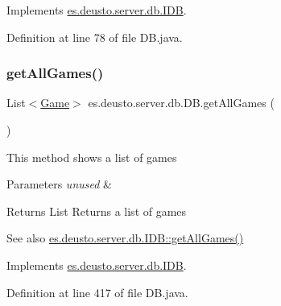 Implements \hyperlink{interfacees_1_1deusto_1_1server_1_1db_1_1_i_d_b_af7500b1f7c74d658837ed1a5ec82ebec}{es.\+deusto.\+server.\+db.\+I\+DB}.



Definition at line 78 of file D\+B.\+java.

\mbox{\label{classes_1_1deusto_1_1server_1_1db_1_1_d_b_ad878c1c58062596b5e1b582ed496bd11}} 
\subsubsection{\texorpdfstring{get\+All\+Games()}{getAllGames()}}
{\footnotesize\ttfamily List$<$\hyperlink{classes_1_1deusto_1_1server_1_1db_1_1data_1_1_game}{Game}$>$ es.\+deusto.\+server.\+db.\+D\+B.\+get\+All\+Games (\begin{DoxyParamCaption}{ }\end{DoxyParamCaption})}

This method shows a list of games 
\begin{DoxyParams}{Parameters}
{\em unused} & \\
\hline
\end{DoxyParams}
\begin{DoxyReturn}{Returns}
List Returns a list of games 
\end{DoxyReturn}
\begin{DoxySeeAlso}{See also}
\hyperlink{interfacees_1_1deusto_1_1server_1_1db_1_1_i_d_b_a76af81d4bb71c81490da92d67c5b6d03}{es.\+deusto.\+server.\+db.\+I\+D\+B\+::get\+All\+Games()} 
\end{DoxySeeAlso}


Implements \hyperlink{interfacees_1_1deusto_1_1server_1_1db_1_1_i_d_b_a76af81d4bb71c81490da92d67c5b6d03}{es.\+deusto.\+server.\+db.\+I\+DB}.



Definition at line 417 of file D\+B.\+java.

\mbox{\label{classes_1_1deusto_1_1server_1_1db_1_1_d_b_a741c4c8b38c31010d5c86e1586ffa880}} 
